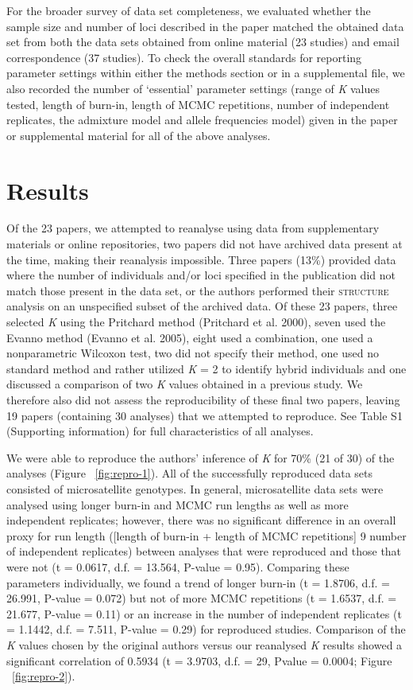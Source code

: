For the broader survey of data set completeness, we evaluated whether the sample size and number of loci described in the paper matched the obtained data set from both the data sets obtained from online material (23 studies) and email correspondence (37 studies). To check the overall standards for reporting parameter settings within either the methods section or in a supplemental file, we also recorded the number of ‘essential’ parameter settings (range of \emph{K} values tested, length of burn-in, length of MCMC repetitions, number of independent replicates, the admixture model and allele frequencies model) given in the paper or supplemental material for all of the above analyses.

\section{Results}
Of the 23 papers, we attempted to reanalyse using data from supplementary materials or online repositories, two papers did not have archived data present at the time, making their reanalysis impossible. Three papers (13\%) provided data where the number of individuals and/or loci specified in the publication did not match those present in the data set, or the authors performed their \textsc{structure} analysis on an unspecified subset of the archived data. Of these 23 papers, three selected \emph{K} using the Pritchard method (Pritchard et al. 2000), seven used the Evanno method (Evanno et al. 2005), eight used a combination, one used a nonparametric Wilcoxon test, two did not specify their method, one used no standard method and rather utilized \emph{K} = 2 to identify hybrid individuals and one discussed a comparison of two \emph{K} values obtained in a previous study. We therefore also did not assess the reproducibility of these final two papers, leaving 19 papers (containing 30 analyses) that we attempted to reproduce. See Table S1 (Supporting information) for full characteristics of all analyses.

We were able to reproduce the authors’ inference of \emph{K} for 70\% (21 of 30) of the analyses (Figure ~\ref{fig:repro-1}). All of the successfully reproduced data sets consisted of microsatellite genotypes. In general, microsatellite data sets were analysed using longer burn-in and MCMC run lengths as well as more independent replicates; however, there was no significant difference in an overall proxy for run length
([length of burn-in + length of MCMC repetitions] 9 number of independent replicates) between 
analyses that were reproduced and those that were not (t = 0.0617, d.f. = 13.564, P-value = 0.95). 
Comparing these parameters individually, we found a trend of longer burn-in (t = 1.8706, d.f. = 26.991, P-value = 0.072) 
but not of more MCMC repetitions (t = 1.6537, d.f. = 21.677, P-value = 0.11) or an increase in the 
number of independent replicates (t = 1.1442, d.f. = 7.511, P-value = 0.29) for reproduced studies. 
Comparison of the \emph{K} values chosen by the original authors versus our reanalysed \emph{K} results 
showed a significant correlation of 0.5934 (t = 3.9703, d.f. = 29, Pvalue = 0.0004; Figure ~\ref{fig:repro-2}).

